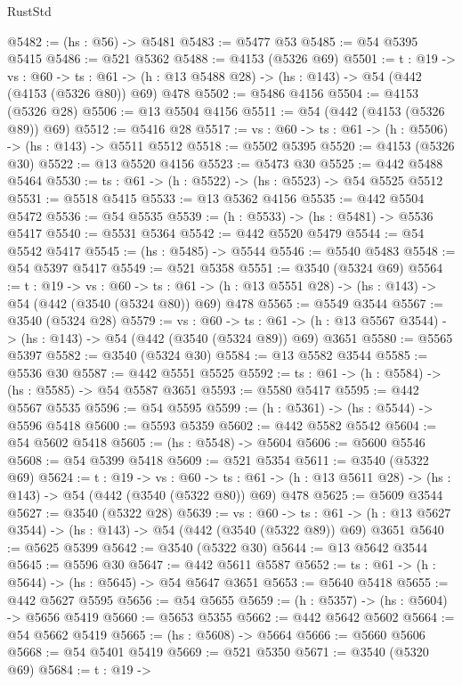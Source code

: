 \begin{lexlean}{RustStd}
\begin{coremodule}
@5482 := (hs : @56) -> @5481
@5483 := @5477 @53
@5485 := @54 @5395 @5415
@5486 := @521 @5362
@5488 := @4153 (@5326 @69)
@5501 := {t : @19} ->
  {vs : @60} ->
  {ts : @61} -> (h : @13 @5488 @28) -> (hs : @143) -> @54 (@442 (@4153 (@5326 @80)) @69) @478
@5502 := @5486 @4156
@5504 := @4153 (@5326 @28)
@5506 := @13 @5504 @4156
@5511 := @54 (@442 (@4153 (@5326 @89)) @69)
@5512 := @5416 @28
@5517 := {vs : @60} -> {ts : @61} -> (h : @5506) -> (hs : @143) -> @5511 @5512
@5518 := @5502 @5395
@5520 := @4153 (@5326 @30)
@5522 := @13 @5520 @4156
@5523 := @5473 @30
@5525 := @442 @5488 @5464
@5530 := {ts : @61} -> (h : @5522) -> (hs : @5523) -> @54 @5525 @5512
@5531 := @5518 @5415
@5533 := @13 @5362 @4156
@5535 := @442 @5504 @5472
@5536 := @54 @5535
@5539 := (h : @5533) -> (hs : @5481) -> @5536 @5417
@5540 := @5531 @5364
@5542 := @442 @5520 @5479
@5544 := @54 @5542 @5417
@5545 := (hs : @5485) -> @5544
@5546 := @5540 @5483
@5548 := @54 @5397 @5417
@5549 := @521 @5358
@5551 := @3540 (@5324 @69)
@5564 := {t : @19} ->
  {vs : @60} ->
  {ts : @61} -> (h : @13 @5551 @28) -> (hs : @143) -> @54 (@442 (@3540 (@5324 @80)) @69) @478
@5565 := @5549 @3544
@5567 := @3540 (@5324 @28)
@5579 := {vs : @60} ->
  {ts : @61} -> (h : @13 @5567 @3544) -> (hs : @143) -> @54 (@442 (@3540 (@5324 @89)) @69) @3651
@5580 := @5565 @5397
@5582 := @3540 (@5324 @30)
@5584 := @13 @5582 @3544
@5585 := @5536 @30
@5587 := @442 @5551 @5525
@5592 := {ts : @61} -> (h : @5584) -> (hs : @5585) -> @54 @5587 @3651
@5593 := @5580 @5417
@5595 := @442 @5567 @5535
@5596 := @54 @5595
@5599 := (h : @5361) -> (hs : @5544) -> @5596 @5418
@5600 := @5593 @5359
@5602 := @442 @5582 @5542
@5604 := @54 @5602 @5418
@5605 := (hs : @5548) -> @5604
@5606 := @5600 @5546
@5608 := @54 @5399 @5418
@5609 := @521 @5354
@5611 := @3540 (@5322 @69)
@5624 := {t : @19} ->
  {vs : @60} ->
  {ts : @61} -> (h : @13 @5611 @28) -> (hs : @143) -> @54 (@442 (@3540 (@5322 @80)) @69) @478
@5625 := @5609 @3544
@5627 := @3540 (@5322 @28)
@5639 := {vs : @60} ->
  {ts : @61} -> (h : @13 @5627 @3544) -> (hs : @143) -> @54 (@442 (@3540 (@5322 @89)) @69) @3651
@5640 := @5625 @5399
@5642 := @3540 (@5322 @30)
@5644 := @13 @5642 @3544
@5645 := @5596 @30
@5647 := @442 @5611 @5587
@5652 := {ts : @61} -> (h : @5644) -> (hs : @5645) -> @54 @5647 @3651
@5653 := @5640 @5418
@5655 := @442 @5627 @5595
@5656 := @54 @5655
@5659 := (h : @5357) -> (hs : @5604) -> @5656 @5419
@5660 := @5653 @5355
@5662 := @442 @5642 @5602
@5664 := @54 @5662 @5419
@5665 := (hs : @5608) -> @5664
@5666 := @5660 @5606
@5668 := @54 @5401 @5419
@5669 := @521 @5350
@5671 := @3540 (@5320 @69)
@5684 := {t : @19} ->

\end{coremodule}
\end{lexlean}
